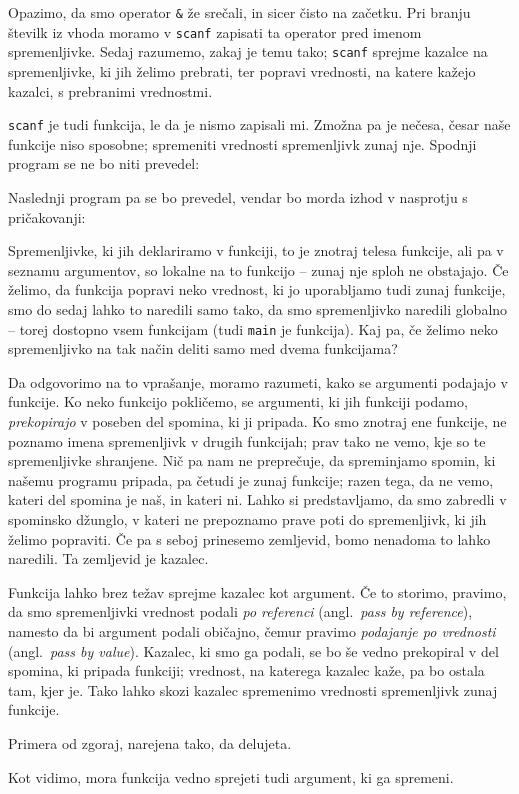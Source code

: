 \documentclass{book}
\begin{document}
Opazimo, da smo operator \verb+&+ že srečali, in sicer čisto na začetku.
Pri branju številk iz vhoda moramo v \verb+scanf+ zapisati ta operator pred
imenom spremenljivke. Sedaj razumemo, zakaj je temu tako; \verb+scanf+ sprejme
kazalce na spremenljivke, ki jih želimo prebrati, ter popravi vrednosti, na
katere kažejo kazalci, s prebranimi vrednostmi.

\begin{examples}
  \verb+scanf+ je tudi funkcija, le da je nismo zapisali mi.
  Zmožna pa je nečesa, česar naše funkcije niso sposobne; spremeniti vrednosti
  spremenljivk zunaj nje. Spodnji program se ne bo niti prevedel:


  Naslednji program pa se bo prevedel, vendar bo morda izhod v nasprotju s
  pričakovanji:


  \begin{inout}
  \end{inout}
\end{examples}

Spremenljivke, ki jih deklariramo v funkciji, to je znotraj telesa funkcije,
ali pa v seznamu argumentov, so lokalne na to funkcijo -- zunaj nje sploh ne
obstajajo. Če želimo, da funkcija popravi neko vrednost, ki jo uporabljamo tudi
zunaj funkcije, smo do sedaj lahko to naredili samo tako, da smo spremenljivko
naredili globalno -- torej dostopno vsem funkcijam
(tudi \verb+main+ je funkcija). Kaj pa, če želimo neko spremenljivko na tak
način deliti samo med dvema funkcijama?

Da odgovorimo na to vprašanje, moramo razumeti, kako se argumenti podajajo v
funkcije. Ko neko funkcijo pokličemo, se argumenti, ki jih funkciji podamo,
\emph{prekopirajo} v poseben del spomina, ki ji pripada. Ko smo znotraj ene
funkcije, ne poznamo imena spremenljivk v drugih funkcijah; prav tako ne vemo,
kje so te spremenljivke shranjene. Nič pa nam ne preprečuje, da spreminjamo
spomin, ki našemu programu pripada, pa četudi je zunaj funkcije;
razen tega, da ne vemo, kateri del spomina je naš, in kateri ni.
Lahko si predstavljamo, da smo zabredli v spominsko džunglo, v kateri
ne prepoznamo prave poti do spremenljivk, ki jih želimo popraviti. Če pa s seboj
prinesemo zemljevid, bomo nenadoma to lahko naredili. Ta zemljevid je kazalec.

Funkcija lahko brez težav sprejme kazalec kot argument. Če to storimo, pravimo,
da smo spremenljivki vrednost podali \emph{po referenci}
(angl.~\textit{pass by reference}), namesto da bi argument podali običajno,
čemur pravimo \emph{podajanje po vrednosti} (angl.~\textit{pass by value}).
Kazalec, ki smo ga podali, se bo še vedno prekopiral v del spomina, ki pripada
funkciji; vrednost, na katerega kazalec kaže, pa bo ostala tam, kjer je.
Tako lahko skozi kazalec spremenimo vrednosti spremenljivk zunaj funkcije.

\begin{examples}
  Primera od zgoraj, narejena tako, da delujeta.


  Kot vidimo, mora funkcija vedno sprejeti tudi argument, ki ga spremeni.


\end{examples}
\end{document}
